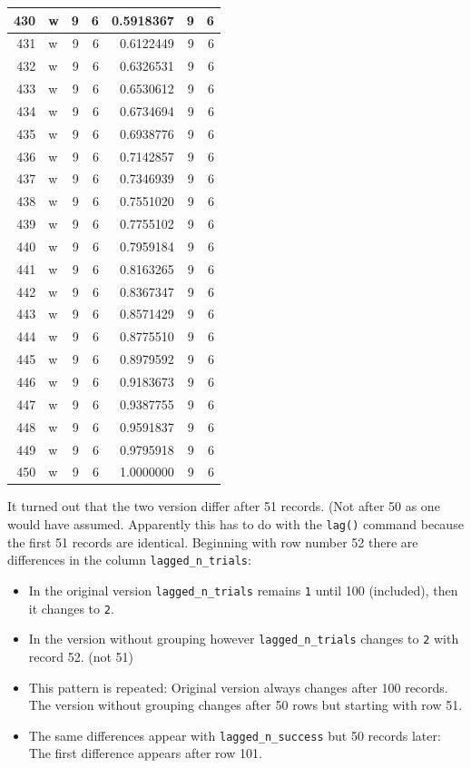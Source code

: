 \documentclass[
  letterpaper,
  DIV=11,
  numbers=noendperiod]{scrreprt}
\providecommand{\tightlist}{%
  \setlength{\itemsep}{0pt}\setlength{\parskip}{0pt}}\usepackage{longtable,booktabs,array}
\begin{document}
\begin{table}
\begin{tabular}[t]{r|l|r|r|r|r|r}
\hline
430 & w & 9 & 6 & 0.5918367 & 9 & 6\\
\hline
431 & w & 9 & 6 & 0.6122449 & 9 & 6\\
\hline
432 & w & 9 & 6 & 0.6326531 & 9 & 6\\
\hline
433 & w & 9 & 6 & 0.6530612 & 9 & 6\\
\hline
434 & w & 9 & 6 & 0.6734694 & 9 & 6\\
\hline
435 & w & 9 & 6 & 0.6938776 & 9 & 6\\
\hline
436 & w & 9 & 6 & 0.7142857 & 9 & 6\\
\hline
437 & w & 9 & 6 & 0.7346939 & 9 & 6\\
\hline
438 & w & 9 & 6 & 0.7551020 & 9 & 6\\
\hline
439 & w & 9 & 6 & 0.7755102 & 9 & 6\\
\hline
440 & w & 9 & 6 & 0.7959184 & 9 & 6\\
\hline
441 & w & 9 & 6 & 0.8163265 & 9 & 6\\
\hline
442 & w & 9 & 6 & 0.8367347 & 9 & 6\\
\hline
443 & w & 9 & 6 & 0.8571429 & 9 & 6\\
\hline
444 & w & 9 & 6 & 0.8775510 & 9 & 6\\
\hline
445 & w & 9 & 6 & 0.8979592 & 9 & 6\\
\hline
446 & w & 9 & 6 & 0.9183673 & 9 & 6\\
\hline
447 & w & 9 & 6 & 0.9387755 & 9 & 6\\
\hline
448 & w & 9 & 6 & 0.9591837 & 9 & 6\\
\hline
449 & w & 9 & 6 & 0.9795918 & 9 & 6\\
\hline
450 & w & 9 & 6 & 1.0000000 & 9 & 6\\
\hline
\end{tabular}
\end{table}

It turned out that the two version differ after 51 records. (Not after
50 as one would have assumed. Apparently this has to do with the
\texttt{lag()} command because the first 51 records are identical.
Beginning with row number 52 there are differences in the column
\texttt{lagged\_n\_trials}:

\begin{itemize}
\tightlist
\item
  In the original version \texttt{lagged\_n\_trials} remains \texttt{1}
  until 100 (included), then it changes to \texttt{2}.
\item
  In the version without grouping however \texttt{lagged\_n\_trials}
  changes to \texttt{2} with record 52. (not 51)
\item
  This pattern is repeated: Original version always changes after 100
  records. The version without grouping changes after 50 rows but
  starting with row 51.
\item
  The same differences appear with \texttt{lagged\_n\_success} but 50
  records later: The first difference appears after row 101.
\end{itemize}
\end{document}
